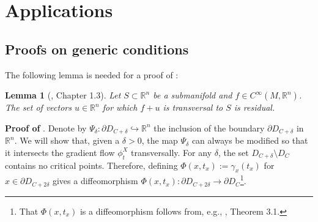 \documentclass[12pt]{article}
\newtheorem{lemma}[theorem]{Lemma}
\begin{document}
\section{Applications}
\label{appendix:hopfield}

\subsection{Proofs on generic conditions}
\label{appendix:generic-conditions}
The following lemma is needed for a proof of :
\begin{lemma}[\cite{palis2012geometric}, Chapter 1.3]
\label{lemma:vectors-transverse-palis}
    Let $S \subset \mathbb{R}^n$ be a submanifold and $f \in C^{\infty}(M, \mathbb{R}^n)$. The set of vectors $u \in \mathbb{R}^n$ for which $f + u$ is transversal to $S$ is residual.
\end{lemma}
\vspace{0.5em}
\noindent
{\bf Proof of }. Denote by $\Psi_{\delta}: \partial D_{C+\delta} \hookrightarrow \mathbb{R}^n$ the inclusion of the boundary $\partial D_{C+\delta}$ in $\mathbb{R}^n$. We will show that, given a $\delta>0$, the map $\Psi_{\delta}$ can always be modified so that it intersects the gradient flow $\phi_t^X$ transversally. For any $\delta$, the set $D_{C+\delta} \setminus D_C$ contains no critical points. Therefore, defining $\Phi(x,t_x):= \gamma_x(t_x)$ for $x \in \partial D_{C+2\delta}$ gives a diffeomorphism $\Phi(x,t_x): \partial D_{C+2\delta} \rightarrow \partial D_C$\footnote{That $\Phi(x,t_x)$ is a diffeomorphism follows from, e.g., \cite{milnor2016morse}, Theorem 3.1.}. 
\end{document}
